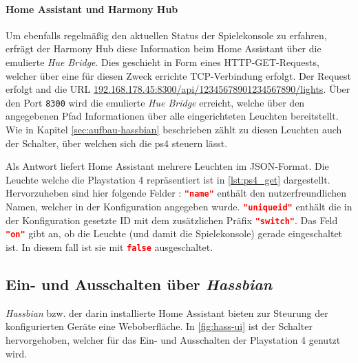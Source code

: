 






\paragraph{Home Assistant und Harmony Hub}
Um ebenfalls regelmäßig den aktuellen Status der Spielekonsole zu erfahren,
erfrägt der Harmony Hub diese Information beim Home Assistant über die emulierte \textit{Hue Bridge}.
Dies geschieht in Form eines HTTP-GET-Requests,
welcher über eine für diesen Zweck errichte TCP-Verbindung erfolgt.
Der Request erfolgt and die URL \url{192.168.178.45:8300/api/12345678901234567890/lights}.
Über den Port \texttt{8300} wird die emulierte \textit{Hue Bridge} erreicht,
welche über den angegebenen Pfad Informationen über alle eingerichteten Leuchten bereitstellt.
Wie in Kapitel \ref{sec:aufbau-hassbian} \textit{} beschrieben zählt zu diesen Leuchten
auch der Schalter, über welchen sich die \ac{ps4} steuern lässt.

Als Antwort liefert Home Assistant mehrere Leuchten im JSON-Format.
Die Leuchte welche die Playstation 4 repräsentiert ist in \autoref{lst:ps4_get} dargestellt.
Hervorzuheben sind hier folgende Felder :
\lstinline[language=json]{"name"} enthält den nutzerfreundlichen Namen,
welcher in der Konfiguration angegeben wurde.
\lstinline[language=json]{"uniqueid"} enthält die
in der Konfiguration gesetzte ID mit dem zusätzlichen Präfix \lstinline[language=json]{"switch"}.
Das Feld \lstinline[language=json]{"on"} gibt an, ob die Leuchte (und damit die Spielekonsole) gerade eingeschaltet ist.
In diesem fall ist sie mit \lstinline[language=json]{false} ausgeschaltet.




\subsection{Ein- und Ausschalten über \textit{Hassbian}}
\textit{Hassbian} bzw. der darin installierte Home Assistant bieten zur Steurung der konfigurierten Geräte eine Weboberfläche.
In \autoref{fig:hass-ui} ist der Schalter hervorgehoben, welcher für das Ein- und Ausschalten der Playstation 4 genutzt wird.

